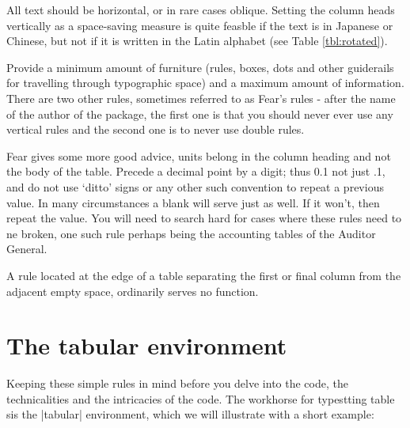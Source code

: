 \begin{multicols}{2}
All text should be horizontal, or in rare cases oblique. Setting the column heads vertically 
as a space-saving measure is quite feasble if the text is in Japanese or Chinese, 
but not if it is written in the Latin alphabet (see Table \ref{tbl:rotated}).

Provide a minimum amount of furniture (rules, boxes, dots and other guiderails for travelling through typographic space) and a maximum amount of information. There are two other rules, sometimes referred to as Fear's rules - after the name of the author of the  package, the first one is that you should never ever use any vertical rules and the second one is to never use double rules\cite{booktabs}.


 Fear gives some more good advice,   units belong in the column heading and not the body of the table. Precede a decimal point by a digit; thus 0.1 not just .1, and do not use ‘ditto’ signs or any other such convention to repeat a previous value. In many circumstances a blank will serve just as well. If it won’t,
then repeat the value. You will need to search hard for cases where these rules need to ne broken, one such rule perhaps being the accounting tables of the Auditor General. 

A rule located at the edge of a table separating the first or final column from the adjacent empty space, ordinarily serves no function.
\end{multicols}

\section{The tabular environment}

Keeping these simple rules in mind before you delve into the code, the technicalities and the intricacies of the code. The \latex workhorse for typestting table sis the |tabular| environment, which we will illustrate with a short example:


\clearpage

